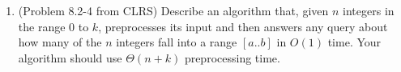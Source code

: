 \documentclass[letterpaper,11pt]{article}
\begin{document}
\begin{enumerate}
\item (Problem 8.2-4 from CLRS) Describe an algorithm that, given $n$ integers in the range $0$ to $k$, preprocesses its input and then answers any query about how many of the $n$ integers fall into a range $[a..b]$ in $O(1)$ time. Your algorithm should use $\Theta(n + k)$ preprocessing time.


\end{enumerate}
\end{document}
